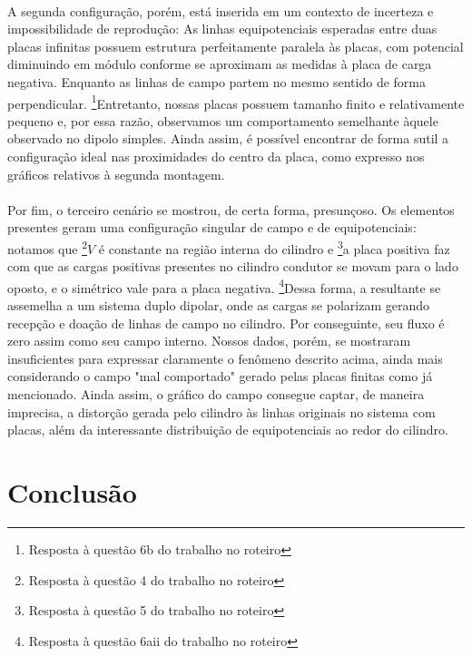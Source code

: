 \documentclass[column,brazilian,12pt,a4paper,final]{article}
\begin{document}
\paragraph{}
A segunda configuração, porém, está inserida em um contexto de incerteza e impossibilidade de reprodução: As linhas equipotenciais esperadas entre duas placas infinitas possuem estrutura perfeitamente paralela às placas, com potencial diminuindo em módulo conforme se aproximam as medidas à placa de carga negativa. Enquanto as linhas de campo partem no mesmo sentido de forma perpendicular. \footnote{Resposta à questão 6b do trabalho no roteiro}Entretanto, nossas placas possuem tamanho finito e relativamente pequeno e, por essa razão, observamos um comportamento semelhante àquele observado no dipolo simples. Ainda assim, é possível encontrar de forma sutil a configuração ideal nas proximidades do centro da placa, como expresso nos gráficos relativos à segunda montagem. 
\paragraph{}
Por fim, o terceiro cenário se mostrou, de certa forma, presunçoso. Os elementos presentes geram uma configuração singular de campo e de equipotenciais: notamos que 
\footnote{Resposta à questão 4 do trabalho no roteiro}$V$ é constante na região interna do cilindro e \footnote{Resposta à questão 5 do trabalho no roteiro}a placa positiva faz com que as cargas positivas presentes no cilindro condutor se movam para o lado oposto, e o simétrico vale para a placa negativa. \footnote{Resposta à questão 6aii do trabalho no roteiro }Dessa forma, a resultante se assemelha a um sistema duplo dipolar, onde as cargas se polarizam gerando recepção e doação de linhas de campo no cilindro. Por conseguinte, seu fluxo é zero assim como seu campo interno. Nossos dados, porém, se mostraram insuficientes para expressar claramente o fenômeno descrito acima, ainda mais considerando o campo "mal comportado"  
  gerado pelas placas finitas como já mencionado. Ainda assim, o gráfico do campo consegue captar, de maneira imprecisa, a distorção gerada pelo cilindro às linhas originais no sistema com placas, além da interessante distribuição de equipotenciais ao redor do cilindro. 


\section{Conclusão}
\end{document}
